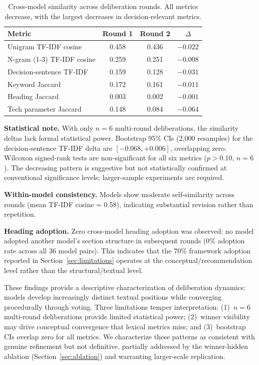 \documentclass[11pt,a4paper]{article}
\begin{document}
\begin{table}[t]
\centering
\caption{Cross-model similarity across deliberation rounds. All metrics decrease, with the largest decreases in decision-relevant metrics.}
\label{tab:similarity}
\begin{tabular}{lccc}
\toprule
Metric & Round 1 & Round 2 & $\Delta$ \\
\midrule
Unigram TF-IDF cosine & 0.458 & 0.436 & $-0.022$ \\
N-gram (1-3) TF-IDF cosine & 0.259 & 0.251 & $-0.008$ \\
Decision-sentence TF-IDF & 0.159 & 0.128 & $-0.031$ \\
Keyword Jaccard & 0.172 & 0.161 & $-0.011$ \\
Heading Jaccard & 0.003 & 0.002 & $-0.001$ \\
Tech parameter Jaccard & 0.148 & 0.084 & $-0.064$ \\
\bottomrule
\end{tabular}
\end{table}

\textbf{Statistical note.} With only $n = 6$ multi-round deliberations, the similarity deltas lack formal statistical power. Bootstrap 95\% CIs (2{,}000 resamples) for the decision-sentence TF-IDF delta are $[-0.068, +0.006]$, overlapping zero. Wilcoxon signed-rank tests are non-significant for all six metrics ($p > 0.10$, $n = 6$). The decreasing pattern is suggestive but not statistically confirmed at conventional significance levels; larger-sample experiments are required.

\textbf{Within-model consistency.} Models show moderate self-similarity across rounds (mean TF-IDF cosine = 0.58), indicating substantial revision rather than repetition.

\textbf{Heading adoption.} Zero cross-model heading adoption was observed: no model adopted another model's section structure in subsequent rounds (0\% adoption rate across all 36 model pairs). This indicates that the 70\% framework adoption reported in Section~\ref{sec:limitations} operates at the conceptual/recommendation level rather than the structural/textual level.

These findings provide a descriptive characterization of deliberation dynamics: models develop increasingly distinct textual positions while converging procedurally through voting. Three limitations temper interpretation: (1)~$n = 6$ multi-round deliberations provide limited statistical power; (2)~winner visibility may drive conceptual convergence that lexical metrics miss; and (3)~bootstrap CIs overlap zero for all metrics. We characterize these patterns as consistent with genuine refinement but not definitive, partially addressed by the winner-hidden ablation (Section~\ref{sec:ablation}) and warranting larger-scale replication.
\end{document}
